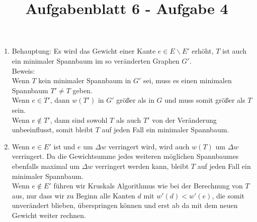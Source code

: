 \documentclass{article}
\title{Aufgabenblatt 6 - Aufgabe 4}
\author{}
\begin{document}
\maketitle

\begin{enumerate}
\item[(a)]
Behauptung:
Es wird das Gewicht einer Kante $e \in E \backslash E'$ erhöht,
$T$ ist auch ein minimaler Spannbaum im so veränderten Graphen $G'$.\\
Beweis:\\
Wenn $T$ kein minimaler Spannbaum in $G'$ sei, muss es einen minimalen Spannbaum $T' \neq T$ geben.\\
Wenn $e \in T'$, dann $w(T')$ in $G'$ gr{\"o}{\ss}er als in $G$ und muss somit gr{\"o}{\ss}er als $T$ sein.\\
Wenn $e \notin T'$, dann sind sowohl $T$ als auch $T'$ von der Ver{\"a}nderung unbeeinflusst, somit bleibt $T$ auf jeden Fall ein minimaler Spannbaum.
\item[(b)]
Wenn $e \in E'$ ist und $e$ um $\Delta w$ verringert wird, wird auch $w(T)$ um $\Delta w$ verringert. Da die Gewichtsumme jedes weiteren möglichen Spannbaumes ebenfalls maximal um $\Delta w$ verringert werden kann, bleibt $T$ auf jeden Fall ein minimaler Spannbaum. \\ 
Wenn $e \notin E'$ führen wir Kruskals Algorithmus wie bei der Berechnung von $T$ aus, nur dass wir zu Beginn alle Kanten $d$ mit $w'(d)<w'(e)$, die somit unverändert blieben, überspringen können und erst ab da mit dem neuen Gewicht weiter rechnen.
\end{enumerate}
\end{document}
